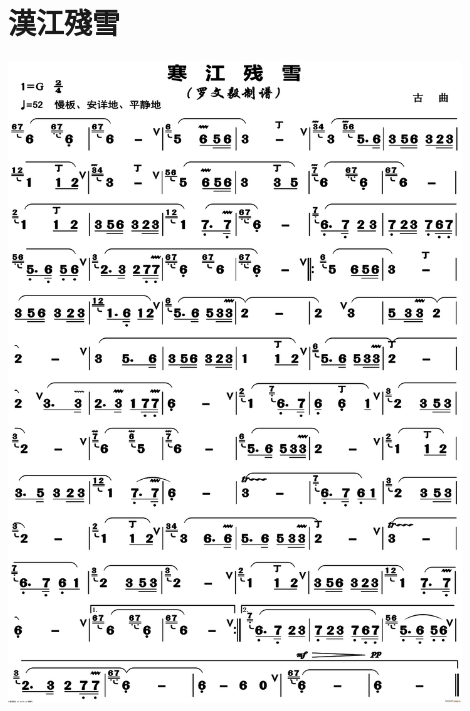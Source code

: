 \documentclass[cn,pad,twocol]{elegantbook}
\begin{document}
\section{漢江殘雪}
    \includegraphics[width=0.9\textwidth]{dongxiao/20201231-汉江残雪} 
\end{document}
